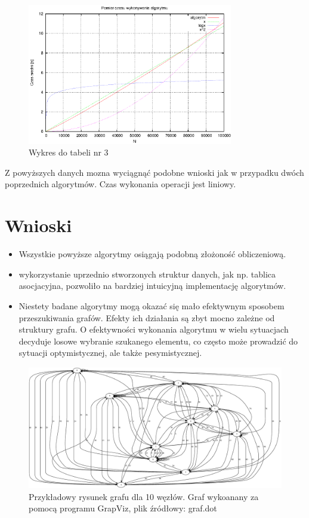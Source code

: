\documentclass[a4paper,11pt]{article}
\begin{document}
\begin{enumerate}
    \begin{figure}[th]
\centering
\includegraphics[width=0.8\textwidth]{../prj/wykres15.eps}
\caption{Wykres do tabeli nr 3}
\label{Wykres do tabeli nr 3}
\end{figure} 
Z powyższych danych mozna wyciągnąć podobne wnioski jak w przypadku dwóch poprzednich algorytmów. Czas wykonania operacji jest liniowy.
\end{enumerate}

\section{Wnioski}

\begin{itemize}
\item Wszystkie powyższe algorytmy osiągają podobną złożoność obliczeniową.

\item wykorzystanie uprzednio stworzonych struktur danych, jak np. tablica asocjacyjna, pozwoliło na bardziej intuicyjną implementację algorytmów.

\item Niestety badane algorytmy mogą okazać się mało efektywnym sposobem przeszukiwania grafów. Efekty ich działania są zbyt mocno zależne od struktury grafu. O efektywności
wykonania algorytmu w wielu sytuacjach decyduje losowe wybranie szukanego elementu, co często może prowadzić do sytuacji optymistycznej, ale także pesymistycznej.
\end{itemize}

\begin{figure}[th]
\centering
\includegraphics[width = 1\textwidth]{../prj/graf.dot.eps}
\caption{Przykładowy rysunek grafu dla 10 węzłów. Graf wykoanany za pomocą programu GrapViz, plik źródłowy: graf.dot}
\label{graf}
\end{figure} 
\end{document}
